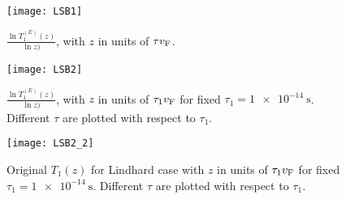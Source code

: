 \documentclass[../main.tex]{subfiles}
\begin{document}
	\begin{figure}[htp]
		\centering
		\texttt{[image: LSB1]}
		\caption{$\frac{\ln{T_{1}^{(E)}(z)}}{\ln{z})}$, with $z$ in units of $\tau v_{\mathrm{F}}$.}\label{fig:lsb:scale1}
	\end{figure}

	\begin{figure}[htp]
		\centering
		\texttt{[image: LSB2]}
		\caption{$\frac{\ln{T_{1}^{(E)}(z)}}{\ln{z})}$, with $z$ in units of $\tau_1 v_{\mathrm{F}}$ for fixed $\tau_1=\SI{1e-14}{\second}$.
		Different $\tau$ are plotted with respect to $\tau_1$.}\label{fig:lsb:scale2}
	\end{figure}

	\begin{figure}[htp]
		\centering
		\texttt{[image: LSB2\_2]}
		\caption{Original $T_1(z)$ for Lindhard case with $z$ in units of $\tau_1 v_{\mathrm{F}}$ for fixed $\tau_1=\SI{1e-14}{\second}$.
		Different $\tau$ are plotted with respect to $\tau_1$.}\label{fig:lsb:scale2.2}
	\end{figure}
\end{document}
